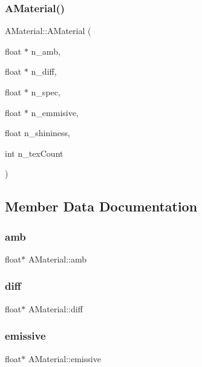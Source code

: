 \subsubsection{\texorpdfstring{A\+Material()}{AMaterial()}}
{\footnotesize\ttfamily A\+Material\+::\+A\+Material (\begin{DoxyParamCaption}\item[{float $\ast$}]{n\+\_\+amb,  }\item[{float $\ast$}]{n\+\_\+diff,  }\item[{float $\ast$}]{n\+\_\+spec,  }\item[{float $\ast$}]{n\+\_\+emmisive,  }\item[{float}]{n\+\_\+shininess,  }\item[{int}]{n\+\_\+tex\+Count }\end{DoxyParamCaption})\hspace{0.3cm}{\ttfamily [inline]}}



\subsection{Member Data Documentation}
\mbox{\label{struct_a_material_a7d78da6f12281285ff0e674420ee0cef}} 
\subsubsection{\texorpdfstring{amb}{amb}}
{\footnotesize\ttfamily float$\ast$ A\+Material\+::amb}

\mbox{\label{struct_a_material_a7511ed9b31c619c784f0b8f8f82da173}} 
\subsubsection{\texorpdfstring{diff}{diff}}
{\footnotesize\ttfamily float$\ast$ A\+Material\+::diff}

\mbox{\label{struct_a_material_a5d3d52b9923b946b2050e7753b39a471}} 
\subsubsection{\texorpdfstring{emissive}{emissive}}
{\footnotesize\ttfamily float$\ast$ A\+Material\+::emissive}

